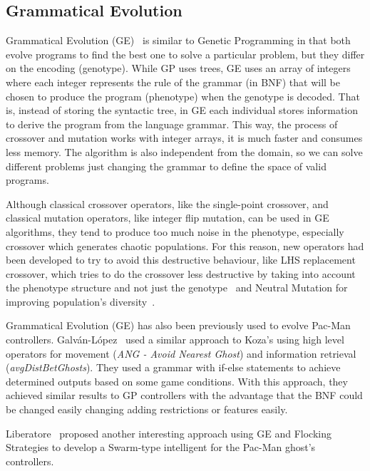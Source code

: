 \documentclass{llncs}
\begin{document}
\subsection{Grammatical Evolution}

Grammatical Evolution (GE)~\cite{o'neill_ryan_2012} is similar to Genetic Programming in that both evolve programs to find the best one to solve a particular problem, but they differ on the encoding (genotype). While GP uses trees, GE uses an array of integers where each integer represents the rule of the grammar (in BNF) that will be chosen to produce the program (phenotype) when the genotype is decoded. That is, instead of storing the syntactic tree, in GE each individual stores information to derive the program from the language grammar. This way, the process of crossover and mutation works with integer arrays, it is much faster and consumes less memory. The algorithm is also independent from the domain, so we can solve different problems just changing the grammar to define the space of valid programs. 

Although classical crossover operators, like the single-point crossover, and classical mutation operators, like integer flip mutation, can be used in GE algorithms, they tend to produce too much noise in the phenotype, especially crossover which generates chaotic populations. For this reason, new operators had been developed to try to avoid this destructive behaviour, like LHS replacement crossover, which tries to do the crossover less destructive by taking into account the phenotype structure and not just the genotype~\cite{harper_blair_2005} and Neutral Mutation for improving population's diversity~\cite{oesch_maringer_2014}.

Grammatical Evolution (GE) has also been previously used to evolve Pac-Man controllers. Galván-López~\cite{galvan2010evolving} used a similar approach to Koza's using high level operators for movement (\textit{ANG - Avoid Nearest Ghost}) and information retrieval (\textit{avgDistBetGhosts}). They used a grammar with if-else statements to achieve determined outputs based on some game conditions. With this approach, they achieved similar results to GP controllers with the advantage that the BNF could be changed easily changing adding restrictions or features easily. 

Liberatore~\cite{Liberatore2014} proposed another interesting approach using GE and Flocking Strategies to develop a Swarm-type intelligent for the Pac-Man ghost's controllers. 
\end{document}

